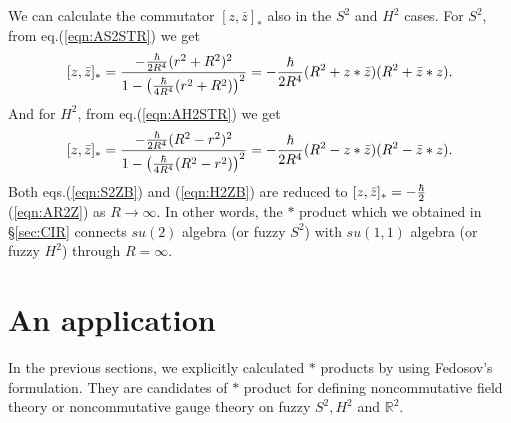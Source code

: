 \documentclass[12pt,a4paper]{article}
\def\h{\hbar}
\begin{document}
We can calculate the  commutator $[z,{\bar z}]_*$ also in the $S^2$ and
$H^2$ cases. 
For $S^2$, from eq.(\ref{eqn:AS2STR}) we get
\begin{equation}
\label{eqn:S2ZB}
[z,{\bar
  z}]_*={-{\h\over2R^4}(r^2+R^2)^2\over1-\left({\h\over4R^4}(r^2+R^2)\right)^2}=-{\h\over2R^4}(R^2+z*{\bar z})(R^2+{\bar z}*z).
\end{equation}
And for $H^2$, from eq.(\ref{eqn:AH2STR}) we get
\begin{equation}
\label{eqn:H2ZB}
[z,{\bar
  z}]_*={-{\h\over2R^4}(R^2-r^2)^2\over1-\left({\h\over4R^4}(R^2-r^2)\right)^2}=-{\h\over2R^4}(R^2-z*{\bar z})(R^2-{\bar z}*z).
\end{equation}
Both eqs.(\ref{eqn:S2ZB}) and (\ref{eqn:H2ZB}) are reduced to
  $[z,{\bar   z}]_*=-{\h\over2}$ (\ref{eqn:AR2Z}) as $R\to\infty$.
In other words, the $*$ product which we obtained in \S\ref{sec:CIR}
connects $su(2)$ algebra (or fuzzy $S^2$) with $su(1,1)$ algebra (or
fuzzy $H^2$) through $R=\infty$.


\section{An application
\label{sec:APP}}

In the previous sections, we explicitly calculated $*$ products by
using Fedosov's formulation. They are candidates of $*$ product for
defining noncommutative field theory or noncommutative gauge theory on
fuzzy $S^2,H^2$ and ${\mathbb R}^2$. 
\end{document}
